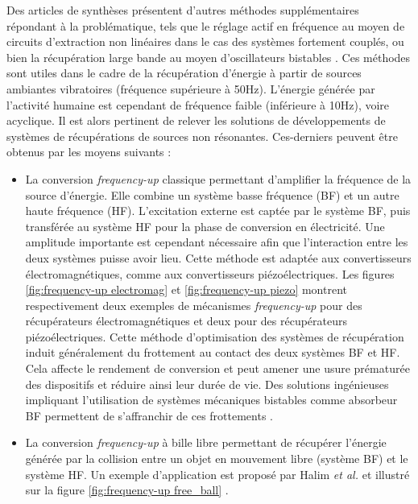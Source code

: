 Des articles de synthèses présentent d'autres méthodes supplémentaires répondant à la problématique, tels que le réglage actif en fréquence au moyen de circuits d'extraction non linéaires dans le cas des systèmes fortement couplés, ou bien la récupération large bande au moyen d'oscillateurs bistables \cite{Yildirim2017,Maamer2019}. Ces méthodes sont utiles dans le cadre de la récupération d'énergie à partir de sources ambiantes vibratoires (fréquence supérieure à 50Hz). L'énergie générée par l'activité humaine est cependant de fréquence faible (inférieure à 10Hz), voire acyclique. Il est alors pertinent de relever les solutions de développements de systèmes de récupérations de sources non résonantes. Ces-derniers peuvent être obtenus par les moyens suivants :
\begin{itemize}[label=$\circ$]	%
	\item La conversion \emph{frequency-up} classique permettant d'amplifier la fréquence de la source d'énergie. Elle combine un système basse fréquence (BF) et un autre haute fréquence (HF). L'excitation externe est captée par le système BF, puis transférée au système HF pour la phase de conversion en électricité. Une amplitude importante est cependant nécessaire afin que l'interaction entre les deux systèmes puisse avoir lieu. Cette méthode est adaptée aux convertisseurs électromagnétiques, comme aux convertisseurs piézoélectriques. Les figures \ref{fig:frequency-up electromag} et \ref{fig:frequency-up piezo} montrent respectivement deux exemples de mécanismes \emph{frequency-up} pour des récupérateurs électromagnétiques et deux pour des récupérateurs piézoélectriques. Cette méthode d'optimisation des systèmes de récupération induit généralement du frottement au contact des deux systèmes BF et HF. Cela affecte le rendement de conversion et peut amener une usure prématurée des dispositifs et réduire ainsi leur durée de vie. Des solutions ingénieuses impliquant l'utilisation de systèmes mécaniques bistables comme absorbeur BF permettent de s'affranchir de ces frottements \cite{Galchev2009}.
	\item La conversion \emph{frequency-up} à bille libre permettant de récupérer l'énergie générée par la collision entre un objet en mouvement libre (système BF) et le système HF. Un exemple d'application est proposé par Halim \emph{et al.} et illustré sur la figure \ref{fig:frequency-up free_ball} \cite{Halim2015}.
\end{itemize}
